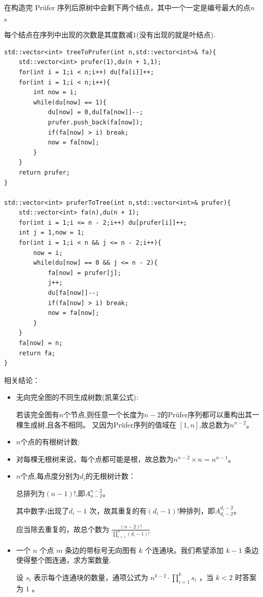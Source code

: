 在构造完 Prüfer 序列后原树中会剩下两个结点，其中一个一定是编号最大的点$n$。

每个结点在序列中出现的次数是其度数减$1$(没有出现的就是叶结点).
\begin{lstlisting}[caption={}]
std::vector<int> treeToPrufer(int n,std::vector<int>& fa){
	std::vector<int> prufer(1),du(n + 1,1);
	for(int i = 1;i < n;i++) du[fa[i]]++;
	for(int i = 1;i < n;i++){
		int now = i;
		while(du[now] == 1){
			du[now] = 0,du[fa[now]]--;
			prufer.push_back(fa[now]);
			if(fa[now] > i) break;
			now = fa[now];
		}
	}
	return prufer;
}

std::vector<int> pruferToTree(int n,std::vector<int>& prufer){
	std::vector<int> fa(n),du(n + 1);
	for(int i = 1;i <= n - 2;i++) du[prufer[i]]++;
	int j = 1,now = 1;
	for(int i = 1;i < n && j <= n - 2;i++){
		now = i;
		while(du[now] == 0 && j <= n - 2){
			fa[now] = prufer[j];
			j++;
			du[fa[now]]--;
			if(fa[now] > i) break;
			now = fa[now];
		}
	}
	fa[now] = n;
	return fa;
}
\end{lstlisting}
相关结论：
\begin{itemize}
    \item 无向完全图的不同生成树数(凯莱公式):
	
    若该完全图有$n$个节点,则任意一个长度为$n - 2$的Prüfer序列都可以重构出其一棵生成树,且各不相同。
    又因为Prüfer序列的值域在 $[1,n]$,故总数为$n^{n - 2}$。
	\item $n$个点的有根树计数:
	\item 
		对每棵无根树来说，每个点都可能是根，故总数为$n^{n - 2} \times n = n ^ {n - 1}$。
	\item $n$个点,每点度分别为$d_i$的无根树计数：
	
		总排列为$(n - 1)!$,即$A_{n - 2}^{n - 2}$。

        其中数字$i$出现了$d_i - 1$ 次，故其重复的有$(d_i - 1)!$种排列，即$A_{d_i - 2}^{d_i - 2}$。

        应当除去重复的，故总个数为 $\frac{(n - 2)!}{\prod_{i = 1}^{n}(d_i - 1)!}$
    \item 一个 $n$ 个点 $m$ 条边的带标号无向图有 $k$ 个连通块。我们希望添加 $k-1$ 条边使得整个图连通，求方案数量.
    
    设 $s_i$ 表示每个连通块的数量，通项公式为 $\displaystyle n^{k-2}\cdot\prod_{i=1}^ks_i$ ，当 $k < 2$ 时答案为 $1$ 。
\end{itemize}